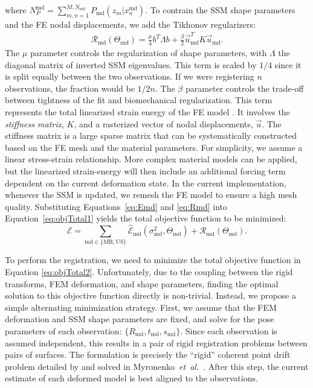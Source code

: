 \documentclass[journal]{IEEEtran}
\newcommand{\trans}[1]{#1^{\scriptscriptstyle T}}
\begin{document}
where $N^\mathrm{md}_P=\sum_{m,n=1}^{M,N_\mathrm{md}}P_\mathrm{md}(z_m|x^\mathrm{md}_n)$.  To contrain the SSM shape parameters and the FE nodal displacements, we add the Tikhonov regularizers:
\begin{align} \label{eq:Rmd}
\mathcal{R}_\mathrm{md}(\Theta_\mathrm{md}) = \frac{\mu}{4}\trans{b}\Lambda{b} + \frac{\beta}{2}\trans{\vec{u}_\mathrm{md}}K\vec{u}_\mathrm{md}. 
\end{align}
The $\mu$ parameter controls the regularization of shape parameters, with $\Lambda$ the diagonal matrix of inverted SSM eigenvalues. This term is scaled by $1/4$ since it is split equally between the two observations.  If we were registering $n$ observations, the fraction would be $1/2n$. The $\beta$ parameter controls the trade-off between tightness of the fit and biomechanical regularization. This term represents the total linearized strain energy of the FE model \cite{Bonet00a}.  It involves the \emph{stiffness matrix}, $K$, and a rasterized vector of nodal displacements, $\vec{u}$.  The stiffness matrix is a large sparse matrix that can be systematically constructed based on the FE mesh and the material parameters.  For simplicity, we assume a linear stress-strain relationship.  More complex material models can be applied, but the linearized strain-energy will then include an additional forcing term dependent on the current deformation state.  In the current implementation, whenever the SSM is updated, we remesh the FE model to ensure a high mesh quality.  Substituting Equations~\eqref{eq:Emd} and \eqref{eq:Rmd} into Equation~\eqref{eq:objTotal1} yields the total objective function to be minimized:
\begin{equation} \label{eq:objTotal2}
\mathcal{E} = \sum_{\mathrm{md}\in\{\mathrm{MR},\mathrm{US}\}}\hat{\mathcal{E}}_{\mathrm{md}}(\sigma^2_\mathrm{md},\Theta_\mathrm{md}) + \mathcal{R}_\mathrm{md}(\Theta_\mathrm{md}).
\end{equation}

To perform the registration, we need to minimize the total objective function in Equation \eqref{eq:objTotal2}.  Unfortunately, due to the coupling between the rigid transforms, FEM deformation, and shape parameters, finding the optimal solution to this objective function directly is non-trivial.  Instead, we propose a simple alternating minimization strategy.  First, we assume that the FEM deformation and SSM shape parameters are fixed, and solve for the pose parameters of each observation: $\{R_\mathrm{md},t_\mathrm{md}, s_\mathrm{md}\}$.  Since each observation is assumed independent, this results in a pair of rigid registration problems between pairs of surfaces.  The formulation is precisely the ``rigid'' coherent point drift problem detailed by and solved in Myronenko~\textit{et~al.}~\cite{Myronenko10a}.  After this step, the current estimate of each deformed model is best aligned to the observations.
\end{document}
